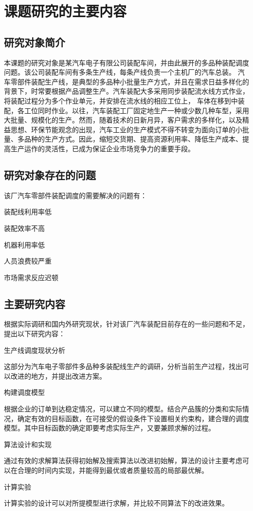 
\chapter{课题研究的主要内容}
\section{研究对象简介}
本课题的研究对象是某汽车电子有限公司装配车间，并由此展开的多品种装配调度问题。该公司装配车间有多条生产线，每条产线负责一个主机厂的汽车总装。
汽车零部件装配生产线，是典型的多品种小批量生产方式，并且在需求日益多样化的背景下，时常要根据产品调整生产。汽车装配大多采用同步装配流水线方式作业，将装配过程分为多个作业单元，并安排在流水线的相应工位上，
车体在移到中装配，各工位同时作业。以往，汽车装配工厂固定地生产一种或少数几种车型，采用大批量、规模化的生产。然而，随着技术的日新月异，客户需求的多样化，以及精益思想、环保节能观念的出现，汽车工业的生产模式不得不转变为面向订单的小批量、多品种的生产方式。因此，缩短交货期、提高资源利用率、降低生产成本、提高生产运作的灵活性，已成为保证企业市场竞争力的重要手段。

\section{研究对象存在的问题}
该厂汽车零部件装配调度的需要解决的问题有：
\begin{asparaenum}[(1)]
\item 装配线利用率低
\item 装配效率不高
\item 机器利用率低
\item 人员浪费较严重
\item 市场需求反应迟顿
\end{asparaenum}

\section{主要研究内容}
根据实际调研和国内外研究现状，针对该厂汽车装配目前存在的一些问题和不足，提出以下研究内容：
\renewcommand{\labelenumi}{(\theenumi)}
\begin{asparaenum}
\item 生产线调度现状分析

这部分为汽车电子零部件多品种多装配线生产的调研，分析当前生产过程，找出可以改进的地方，并提出改进方案。
\item 构建调度模型

根据企业的订单到达稳定情况，可以建立不同的模型。结合产品簇的分类和实际情况，确定有效的目标函数，在可接受的假设条件下设置相关约束构，建合理的调度模型。其中目标函数的确定即要考虑实际生产，又要兼顾求解的过程。
\item 算法设计和实现

通过有效的求解算法获得初始解及搜索算法以改进初始解，算法的设计主要考虑可以在合理的时间内实现，并能得到最优或者质量较高的局部最优解。
\item 计算实验
\end{asparaenum}

计算实验的设计可以对所提模型进行求解，并比较不同算法下的改进效果。